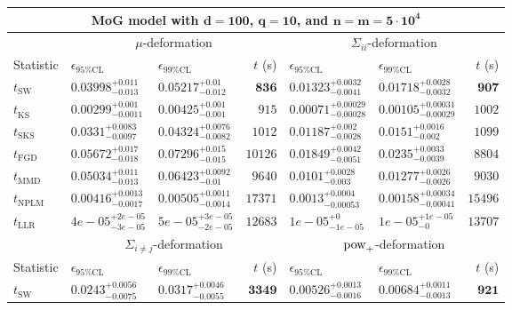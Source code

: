 \begin{tabular}{l|llr|llr}
	\toprule
	\multicolumn{7}{c}{{\bf MoG model with $\mathbf{d=100}$, $\mathbf{q=10}$, and $\mathbf{n=m=5\cdot 10^{4}}$}} \\
	\toprule
	\multicolumn{1}{c}{} & \multicolumn{3}{c}{$\mu$-deformation} & \multicolumn{3}{c}{$\Sigma_{ii}$-deformation} \\
	Statistic & $\epsilon_{95\%\mathrm{CL}}$ & $\epsilon_{99\%\mathrm{CL}}$ & $t$ (s) & $\epsilon_{95\%\mathrm{CL}}$ & $\epsilon_{99\%\mathrm{CL}}$ & $t$ (s) \\
	\midrule
	$t_{\mathrm{SW}}$ & $0.03998_{-0.013}^{+0.011}$ & $0.05217_{-0.012}^{+0.01}$ & ${\mathbf{836}}$ & $0.01323_{-0.0041}^{+0.0032}$ & $0.01718_{-0.0032}^{+0.0028}$ & ${\mathbf{907}}$ \\
	$t_{\overline{\mathrm{KS}}}$ & ${\mathbf{0.00299_{-0.0011}^{+0.001}}}$ & ${\mathbf{0.00425_{-0.001}^{+0.001}}}$ & $915$ & ${\mathbf{0.00071_{-0.00028}^{+0.00029}}}$ & ${\mathbf{0.00105_{-0.00029}^{+0.00031}}}$ & $1002$ \\
	$t_{\mathrm{SKS}}$ & $0.0331_{-0.0097}^{+0.0083}$ & $0.04324_{-0.0082}^{+0.0076}$ & $1012$ & $0.01187_{-0.0028}^{+0.002}$ & $0.0151_{-0.002}^{+0.0016}$ & $1099$ \\
	$t_{\mathrm{FGD}}$ & $0.05672_{-0.018}^{+0.017}$ & $0.07296_{-0.015}^{+0.015}$ & $10126$ & $0.01849_{-0.0051}^{+0.0042}$ & $0.0235_{-0.0039}^{+0.0033}$ & $8804$ \\
	$t_{\mathrm{MMD}}$ & $0.05034_{-0.013}^{+0.011}$ & $0.06423_{-0.01}^{+0.0092}$ & $9640$ & $0.0101_{-0.003}^{+0.0028}$ & $0.01277_{-0.0026}^{+0.0026}$ & $9030$ \\
\rowcolor{red!35}	$t_{\mathrm{NPLM}}$ & $0.00416_{-0.0017}^{+0.0013}$ & $0.00505_{-0.0014}^{+0.0011}$ & $17371$ & $0.0013_{-0.00053}^{+0.0004}$ & $0.00158_{-0.00041}^{+0.00034}$ & $15496$ \\
	$t_{\mathrm{LLR}}$ & $4e-05_{-3e-05}^{+2e-05}$ & $5e-05_{-2e-05}^{+3e-05}$ & $12683$ & $1e-05_{-1e-05}^{+0}$ & $1e-05_{-0}^{+1e-05}$ & $13707$ \\
	\toprule
	\multicolumn{1}{c}{} & \multicolumn{3}{c}{$\Sigma_{i\neq j}$-deformation} & \multicolumn{3}{c}{$\rm{pow}_{+}$-deformation} \\
	Statistic & $\epsilon_{95\%\mathrm{CL}}$ & $\epsilon_{99\%\mathrm{CL}}$ & $t$ (s) & $\epsilon_{95\%\mathrm{CL}}$ & $\epsilon_{99\%\mathrm{CL}}$ & $t$ (s) \\
	\midrule
	$t_{\mathrm{SW}}$ & $0.0243_{-0.0075}^{+0.0056}$ & $0.0317_{-0.0055}^{+0.0046}$ & ${\mathbf{3349}}$ & $0.00526_{-0.0016}^{+0.0013}$ & $0.00684_{-0.0013}^{+0.0011}$ & ${\mathbf{921}}$ \\

\end{tabular}
